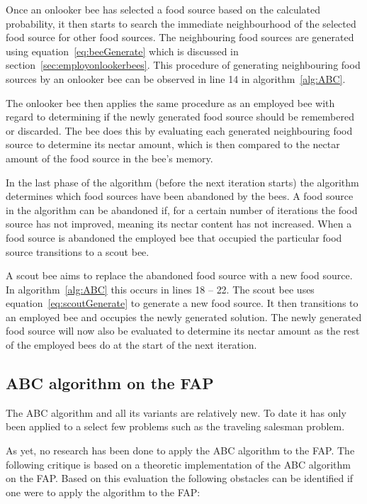 Once an onlooker bee has selected a food source based on the calculated probability, it then starts to search the immediate neighbourhood of the selected food source for other food sources. The neighbouring food sources are generated using equation~\ref{eq:beeGenerate} which is discussed in section~\ref{sec:employonlookerbees}. This procedure of generating neighbouring food sources by an onlooker bee can be observed in line 14 in algorithm~\ref{alg:ABC}.

The onlooker bee then applies the same procedure as an employed bee with regard to determining if the newly generated food source should be remembered or discarded. The bee does this by evaluating each generated neighbouring food source to determine its nectar amount, which is then compared to the nectar amount of the food source in the bee's memory.

In the last phase of the algorithm (before the next iteration starts) the algorithm determines which food sources have been abandoned by the bees. A food source in the algorithm can be abandoned if, for a certain number of iterations the food source has not improved, meaning its nectar content has not increased. When a food source is abandoned the employed bee that occupied the particular food source transitions to a scout bee.

A scout bee aims to replace the abandoned food source with a new food source. In algorithm~\ref{alg:ABC} this occurs in lines 18 -- 22. The scout bee uses equation~\ref{eq:scoutGenerate} to generate a new food source. It then transitions to an employed bee and occupies the newly generated solution. The newly generated food source will now also be evaluated to determine its nectar amount as the rest of the employed bees do at the start of the next iteration.


\subsection{ABC algorithm on the \gls{FAP}}
The \gls{ABC} algorithm and all its variants are relatively new. To date it has only been applied to a select few problems such as the traveling salesman problem.

As yet, no research has been done to apply the \gls{ABC} algorithm to the \gls{FAP}. The following critique is based on a theoretic implementation of the \gls{ABC} algorithm on the \gls{FAP}. Based on this evaluation the following obstacles can be identified if one were to apply the algorithm to the \gls{FAP}:
